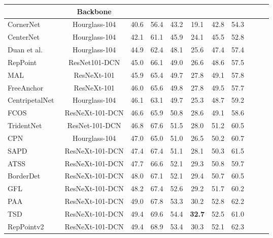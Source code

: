 \documentclass{article}
\begin{document}
\begin{table*}[t]
\centering
\begin{tabular}{@{}l@{\ \ \ \ }c@{\ \ \ \ }c@{\ \ \ \ }c@{\ \ \ \ }c@{\ \ \ \ }c@{\ \ \ \ }c@{\ \ \ \ }c@{\ \ \ \ }c@{\ \ \ \ }c@{\ \ \ \ }c@{}}
\toprule
& Backbone &  &  &  &  &  &   \\
\midrule
        CornerNet~\cite{Law_2018_ECCV} & Hourglass-104 & 40.6 & 56.4 & 43.2 & 19.1 & 42.8 & 54.3 \\
        CenterNet~\cite{zhou2019objects} & Hourglass-104 & 42.1 & 61.1& 45.9 & 24.1 & 45.5 & 52.8\\
        Duan et al.~\cite{duan2019centernet} & Hourglass-104 &  44.9 & 62.4 & 48.1 & 25.6 & 47.4 & 57.4 \\
        RepPoint~\cite{yang2019reppoints} & ResNet101-DCN &45.0 & 66.1 & 49.0 & 26.6 & 48.6 & 57.5 \\
        MAL~\cite{ke2020multiple} & ResNeXt-101 &  45.9 & 65.4 & 49.7 & 27.8 & 49.1 & 57.8 \\
        FreeAnchor~\cite{zhang2019freeanchor} & ResNeXt-101 & 46.0 & 65.6 & 49.8 & 27.8 & 49.5 & 57.7 \\
        CentripetalNet~\cite{Dong_2020_CVPR} & Hourglass-104 & 46.1 & 63.1 & 49.7 & 25.3 & 48.7 & 59.2 \\
        FCOS~\cite{tian2019fcos} & ResNeXt-101-DCN & 46.6 & 65.9 & 50.8 & 28.6 & 49.1 & 58.6 \\
        TridentNet~\cite{li2019scale} & ResNet-101-DCN & 46.8 & 67.6 & 51.5 & 28.0 & 51.2 & 60.5 \\
        CPN~\cite{duan2020corner} & Hourglass-104 & 47.0 & 65.0 & 51.0 & 26.5 & 50.2 & 60.7\\
        SAPD~\cite{zhu2019soft} & ResNeXt-101-DCN & 47.4 & 67.4 & 51.1 & 28.1 & 50.3 & 61.5\\
        ATSS~\cite{zhang2020bridging} & ResNeXt-101-DCN & 47.7 & 66.6 & 52.1 & 29.3 & 50.8 & 59.7 \\
        BorderDet~\cite{yang2019reppoints} & ResNeXt-101-DCN & 48.0 & 67.1 & 52.1 & 29.4 & 50.7 & 60.5 \\
        GFL~\cite{li2020generalized} & ResNeXt-101-DCN &  48.2 & 67.4 & 52.6 & 29.2 & 51.7 & 60.2 \\
        PAA~\cite{paa-eccv2020} & ResNeXt-101-DCN & 49.0 & 67.8 & 53.3 & 30.2 & 52.8 & 62.2 \\
        TSD~\cite{song2020revisiting} & ResNeXt-101-DCN & 49.4 & 69.6 & 54.4 & \textbf{32.7} & 52.5 & 61.0 \\
        RepPointv2~\cite{yang2019reppoints} & ResNeXt-101-DCN & 49.4 & 68.9 & 53.4 & 30.3 & 52.1 & 62.3 \\

\end{tabular}
\end{table*}
\end{document}
